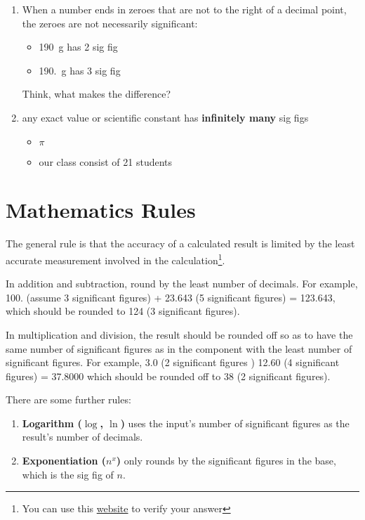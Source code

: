 \documentclass[a4paper]{tufte-handout}
\begin{document}
\begin{enumerate}
	\item When a number ends in zeroes that are not to the right of a decimal point, the zeroes are not necessarily significant:
	\begin{itemize}
		\item \SI{190}{\g} has 2 sig fig
		\item \SI{190.}{\g} has 3 sig fig
	\end{itemize}
	Think, what makes the difference?

	\item any exact value or scientific constant has \textbf{infinitely many} sig figs
	\begin{itemize}
		\item $\pi$
		\item our class consist of 21 students
	\end{itemize}
\end{enumerate}

\section{Mathematics Rules}
The general rule is that the accuracy of a calculated result is limited by the least accurate measurement involved in the calculation\footnote{You can use this \href{https://www.sigfigscalculator.com}{website} to verify your answer}.

In addition and subtraction, round by the least number of decimals. For example, 100. (assume 3 significant figures) + 23.643 (5 significant figures) = 123.643, which should be rounded to 124 (3 significant figures).

In multiplication and division, the result should be rounded off so as to have the same number of significant figures as in the component with the least number of significant figures. For example, 3.0 (2 significant figures ) 12.60 (4 significant figures) = 37.8000 which should be rounded off to 38 (2 significant figures).

There are some further rules:
\begin{enumerate}
	\item \textbf{Logarithm ($\log$, $\ln$)} uses the input's number of significant figures as the result's number of decimals.
	\item \textbf{Exponentiation ($n^x$)} only rounds by the significant figures in the base, which is the sig fig of $n$.
\end{enumerate}
\end{document}
